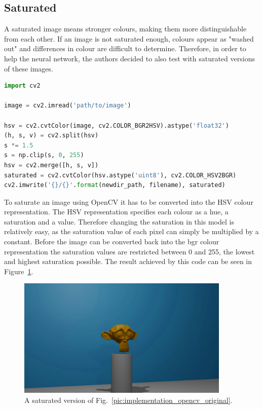 \subsection{Saturated}
A saturated image means stronger colours, making them more distinguishable from each other. If an image is not saturated enough, colours appear as "washed out" and differences in colour are difficult to determine. Therefore, in order to help the neural network, the authors decided to also test with saturated versions of these images.

\begin{lstlisting}[language=python]
import cv2

image = cv2.imread('path/to/image')

hsv = cv2.cvtColor(image, cv2.COLOR_BGR2HSV).astype('float32')
(h, s, v) = cv2.split(hsv)
s *= 1.5
s = np.clip(s, 0, 255)
hsv = cv2.merge([h, s, v])
saturated = cv2.cvtColor(hsv.astype('uint8'), cv2.COLOR_HSV2BGR)
cv2.imwrite('{}/{}'.format(newdir_path, filename), saturated)
\end{lstlisting}

To saturate an image using OpenCV it has to be converted into the HSV colour representation. The HSV representation specifies each colour as a hue, a saturation and a value. Therefore changing the saturation in this model is relatively easy, as the saturation value of each pixel can simply be multiplied by a constant. Before the image can be converted back into the bgr colour representation the saturation values are restricted between 0 and 255, the lowest and highest saturation possible. The result achieved by this code can be seen in Figure~\ref{pic:implementation_opencv_saturated}.

\begin{figure}[h!]
	\centering
	\includegraphics[width=4in]{img/implementation_opencv_saturated.jpg}
	\caption{A saturated version of Fig.~\ref{pic:implementation_opencv_original}.}
	\label{pic:implementation_opencv_saturated}
\end{figure}

